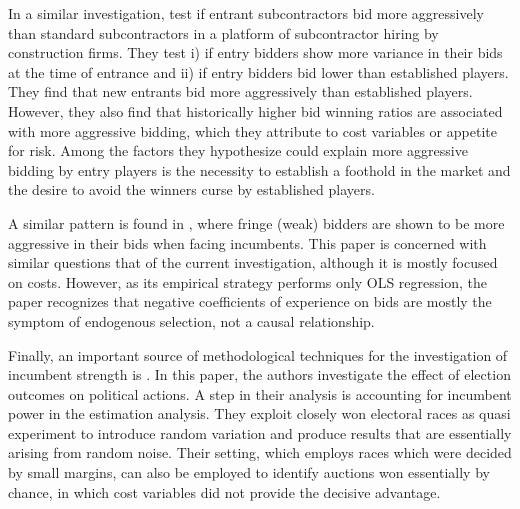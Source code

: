 In a similar investigation, \citep{li2012construction} test if entrant subcontractors bid more aggressively than standard subcontractors in a platform of subcontractor hiring by construction firms. They test i) if entry bidders show more variance in their bids at the time of entrance and ii) if entry bidders bid lower than established players. They find that new entrants bid more aggressively than established players. However, they also find that historically higher bid winning ratios are associated with more aggressive bidding, which they attribute to cost variables or appetite for risk. Among the factors they hypothesize could explain more aggressive bidding by entry players is the necessity to establish a foothold in the market and the desire to avoid the winners curse by established players.

A similar pattern is found in \citep{estache2010bidder}, where fringe (weak) bidders are shown to be more aggressive in their bids when facing incumbents. This paper is concerned with similar questions that of the current investigation, although it is mostly focused on costs. However, as its empirical strategy performs only OLS regression, the paper recognizes that negative coefficients of experience on bids are mostly the symptom of endogenous selection, not a causal relationship.

Finally, an important source of methodological techniques for the investigation of incumbent strength is \citep{lee2004voters}. In this paper, the authors investigate the effect of election outcomes on political actions. A step in their analysis is accounting for incumbent power in the estimation analysis. They exploit closely won electoral races as quasi experiment to introduce random variation and produce results that are essentially arising from random noise. Their setting, which employs races which were decided by small margins, can also be employed to identify auctions won essentially by chance, in which cost variables did not provide the decisive advantage.
